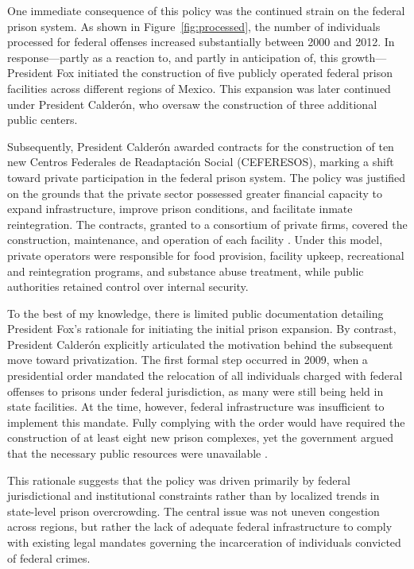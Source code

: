 
One immediate consequence of this policy was the continued strain on the federal prison system. As shown in Figure~\ref{fig:processed}, the number of individuals processed for federal offenses increased substantially between 2000 and 2012. In response—partly as a reaction to, and partly in anticipation of, this growth—President Fox initiated the construction of five publicly operated federal prison facilities across different regions of Mexico. This expansion was later continued under President Calderón, who oversaw the construction of three additional public centers.

Subsequently, President Calderón awarded contracts for the construction of ten new Centros Federales de Readaptación Social (CEFERESOS), marking a shift toward private participation in the federal prison system. The policy was justified on the grounds that the private sector possessed greater financial capacity to expand infrastructure, improve prison conditions, and facilitate inmate reintegration. The contracts, granted to a consortium of private firms, covered the construction, maintenance, and operation of each facility \citep{Evalua}. Under this model, private operators were responsible for food provision, facility upkeep, recreational and reintegration programs, and substance abuse treatment, while public authorities retained control over internal security.

To the best of my knowledge, there is limited public documentation detailing President Fox’s rationale for initiating the initial prison expansion. By contrast, President Calderón explicitly articulated the motivation behind the subsequent move toward privatization. The first formal step occurred in 2009, when a presidential order mandated the relocation of all individuals charged with federal offenses to prisons under federal jurisdiction, as many were still being held in state facilities. At the time, however, federal infrastructure was insufficient to implement this mandate. Fully complying with the order would have required the construction of at least eight new prison complexes, yet the government argued that the necessary public resources were unavailable \citep{ZaldivarGonzalez2020Privatizacion}.

This rationale suggests that the policy was driven primarily by federal jurisdictional and institutional constraints rather than by localized trends in state-level prison overcrowding. The central issue was not uneven congestion across regions, but rather the lack of adequate federal infrastructure to comply with existing legal mandates governing the incarceration of individuals convicted of federal crimes.




